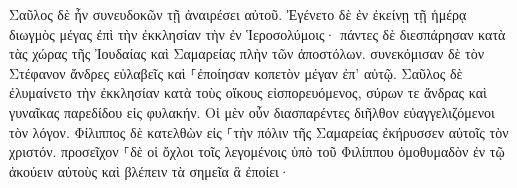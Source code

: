 \documentclass{openreader}
\begin{document}
Σαῦλος δὲ ἦν συνευδοκῶν τῇ ἀναιρέσει αὐτοῦ. Ἐγένετο δὲ ἐν ἐκείνῃ τῇ ἡμέρᾳ διωγμὸς μέγας ἐπὶ τὴν ἐκκλησίαν τὴν ἐν Ἱεροσολύμοις· πάντες δὲ διεσπάρησαν κατὰ τὰς χώρας τῆς Ἰουδαίας καὶ Σαμαρείας πλὴν τῶν ἀποστόλων. 
συνεκόμισαν δὲ τὸν Στέφανον ἄνδρες εὐλαβεῖς καὶ ⸀ἐποίησαν κοπετὸν μέγαν ἐπ’ αὐτῷ. 
Σαῦλος δὲ ἐλυμαίνετο τὴν ἐκκλησίαν κατὰ τοὺς οἴκους εἰσπορευόμενος, σύρων τε ἄνδρας καὶ γυναῖκας παρεδίδου εἰς φυλακήν. 
Οἱ μὲν οὖν διασπαρέντες διῆλθον εὐαγγελιζόμενοι τὸν λόγον. 
Φίλιππος δὲ κατελθὼν εἰς ⸀τὴν πόλιν τῆς Σαμαρείας ἐκήρυσσεν αὐτοῖς τὸν χριστόν. 
προσεῖχον ⸀δὲ οἱ ὄχλοι τοῖς λεγομένοις ὑπὸ τοῦ Φιλίππου ὁμοθυμαδὸν ἐν τῷ ἀκούειν αὐτοὺς καὶ βλέπειν τὰ σημεῖα ἃ ἐποίει· 
\end{document}
